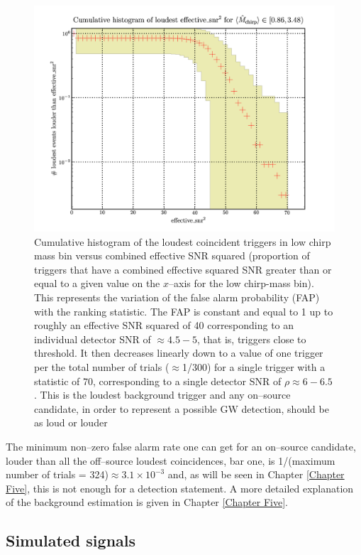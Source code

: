 \begin{figure}[ht!]
\centering
\includegraphics[scale=0.35]{Images/Triggers_Mc1.png}
\caption{Cumulative histogram of the loudest coincident triggers in low chirp mass bin versus combined effective SNR squared (proportion of triggers that have a combined effective squared SNR greater than or equal to a given value on the $x$--axis for the low chirp-mass bin). This represents the variation of the false alarm probability (FAP) with the ranking statistic. The FAP is constant and equal to 1 up to roughly an effective SNR squared of 40 corresponding to an individual detector SNR of $\approx4.5 - 5$, that is, triggers close to threshold. It then decreases linearly down to a value of one trigger per the total number of trials ($\approx$1/300) for a single trigger with a statistic of 70, corresponding to a single detector SNR of $\rho \approx 6 - 6.5$. This is the loudest background trigger and any on--source candidate, in order to represent a possible GW detection, should be as loud or louder}
\label{FARlowbin}
\end{figure}

The minimum non--zero false alarm rate one can get for an on--source candidate, louder than all the off--source loudest coincidences, bar one, is 1/(maximum number of trials = 324)$\approx3.1 \times 10^{-3}$ and, as will be seen in Chapter \ref{Chapter Five}, this is not enough for a detection statement. A more detailed explanation of the background estimation is given in Chapter \ref{Chapter Five}.

\subsection{Simulated signals}
\label{siminj}

